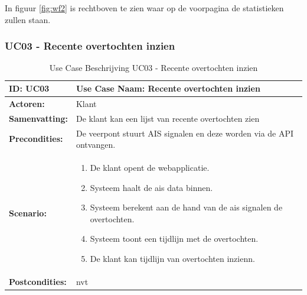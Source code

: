 \documentclass{article}
\begin{document}
In figuur \ref{fig:wf2} is rechtboven te zien waar op de voorpagina de statistieken zullen staan.


\subsubsection{UC03 - Recente overtochten inzien}
\begin{table}[H]
    \centering
    \begin{tabularx}{\textwidth}{|l|X|}
        \hline
        \textbf{ID:} UC03 & \textbf{Use Case Naam:} Recente overtochten inzien  \\
        \hline
        \textbf{Actoren:} & Klant \\
        \hline
        \textbf{Samenvatting:}  & De klant kan een lijst van recente overtochten zien\\
        \hline 
        \textbf{Precondities:} & De veerpont stuurt AIS signalen en deze worden via de API ontvangen. \\
        \hline
        \textbf{Scenario:} & \begin{enumerate}
            \item De klant opent de webapplicatie.
            \item Systeem haalt de ais data binnen.
            \item Systeem berekent aan de hand van de ais signalen de overtochten.
            \item Systeem toont een tijdlijn met de overtochten.
            \item De klant kan tijdlijn van overtochten inzienn.
        \end{enumerate} \\
        \hline 
        \textbf{Postcondities:} & nvt \\ 
        \hline

    \end{tabularx}
    \caption{Use Case Beschrijving UC03 - Recente overtochten inzien}
\end{table}
\end{document}

